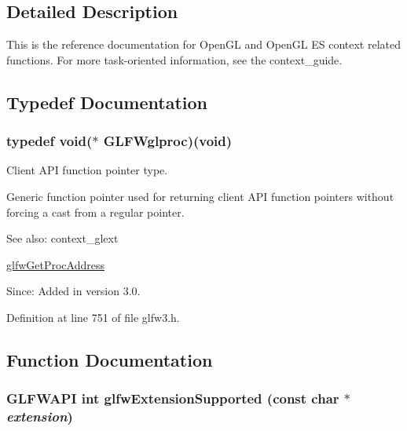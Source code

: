 \subsection{Detailed Description}
This is the reference documentation for OpenGL and OpenGL ES context related functions. For more task-oriented information, see the context\_\-guide. 

\subsection{Typedef Documentation}
\hypertarget{group__context_gbf42b10edde1c4fc71e212e576b9f811}{
\subsubsection[GLFWglproc]{\setlength{\rightskip}{0pt plus 5cm}typedef void($\ast$ {\bf GLFWglproc})(void)}}
\label{group__context_gbf42b10edde1c4fc71e212e576b9f811}


Client API function pointer type. 

Generic function pointer used for returning client API function pointers without forcing a cast from a regular pointer.

\begin{Desc}
\item[See also:]context\_\-glext 

\hyperlink{group__context_g0e8af175218929615c16e74938c10f2a}{glfwGetProcAddress}\end{Desc}
\begin{Desc}
\item[Since:]Added in version 3.0. \end{Desc}


Definition at line 751 of file glfw3.h.

\subsection{Function Documentation}
\hypertarget{group__context_g9a28c712d35f9e43534e1d03b051c04c}{
\subsubsection[glfwExtensionSupported]{\setlength{\rightskip}{0pt plus 5cm}GLFWAPI int glfwExtensionSupported (const char $\ast$ {\em extension})}}
\label{group__context_g9a28c712d35f9e43534e1d03b051c04c}


